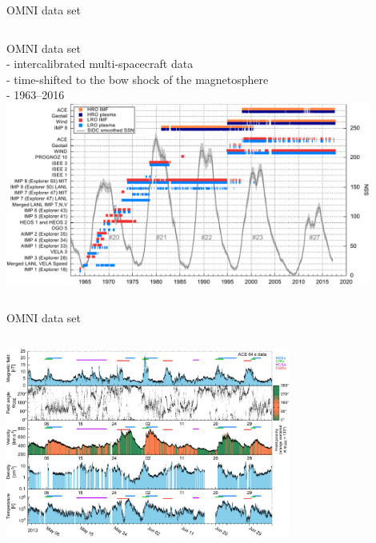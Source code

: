 \begin{frame}[plain,c]{OMNI data set}{}
	\begin{columns}[c]
	\column{\textwidth}
		
		OMNI data set \citep{King2005}\\
		- intercalibrated multi-spacecraft data\\
		- time-shifted to the bow shock of the magnetosphere\\
		- 1963--2016\\
		\centering
		\includegraphics[width=0.9\textwidth]{../figures_of_mine/gnuplots/timeline_OMNI_SC_IDs.pdf}
		
	\end{columns}
\end{frame}
\begin{frame}[plain,c]{OMNI data set}{}
	\begin{columns}[c]
	\column{\textwidth}
		
		\centering
		\includegraphics[width=0.7\textwidth]{../figures_of_mine/gnuplots/ACE_64s_v7_thesis_CIRs_2013-5-1_65_plot.pdf}
		
	\end{columns}
\end{frame}
